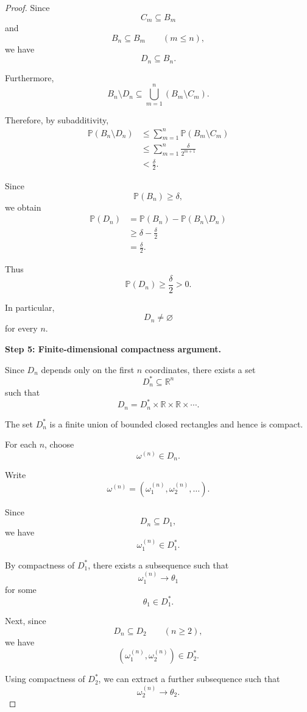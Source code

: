 \begin{proof}
Since
\[
C_m\subseteq B_m
\]
and
\[
B_n\subseteq B_m
\qquad
(m\leq n),
\]
we have
\[
D_n\subseteq B_n.
\]

Furthermore,
\[
B_n\setminus D_n
\subseteq
\bigcup_{m=1}^n(B_m\setminus C_m).
\]

Therefore, by subadditivity,
\[
\begin{aligned}
\mathbb{P}(B_n\setminus D_n)
&\leq
\sum_{m=1}^n
\mathbb{P}(B_m\setminus C_m)\\
&\leq
\sum_{m=1}^n
\frac{\delta}{2^{m+1}}\\
&<
\frac{\delta}{2}.
\end{aligned}
\]

Since
\[
\mathbb{P}(B_n)\geq\delta,
\]
we obtain
\[
\begin{aligned}
\mathbb{P}(D_n)
&=
\mathbb{P}(B_n)
-
\mathbb{P}(B_n\setminus D_n)\\
&\geq
\delta-\frac{\delta}{2}\\
&=
\frac{\delta}{2}.
\end{aligned}
\]

Thus
\[
\boxed{
\mathbb{P}(D_n)\geq\frac{\delta}{2}>0.
}
\tag{5}
\]

In particular,
\[
D_n\neq\varnothing
\]
for every $n$.

\medskip
\noindent
\textbf{Step 5: Finite-dimensional compactness argument.}

Since $D_n$ depends only on the first $n$ coordinates, there exists
a set
\[
D_n^*\subseteq\mathbb{R}^n
\]
such that
\[
D_n
=
D_n^*
\times
\mathbb{R}
\times\mathbb{R}\times\cdots.
\]

The set $D_n^*$ is a finite union of bounded closed rectangles and
hence is compact.

For each $n$, choose
\[
\omega^{(n)}\in D_n.
\]

Write
\[
\omega^{(n)}
=
\left(
\omega^{(n)}_1,
\omega^{(n)}_2,\ldots
\right).
\]

Since
\[
D_n\subseteq D_1,
\]
we have
\[
\omega^{(n)}_1\in D_1^*.
\]

By compactness of $D_1^*$, there exists a subsequence such that
\[
\omega^{(n)}_1\longrightarrow\theta_1
\]
for some
\[
\theta_1\in D_1^*.
\]

Next, since
\[
D_n\subseteq D_2
\qquad(n\geq2),
\]
we have
\[
(\omega^{(n)}_1,\omega^{(n)}_2)\in D_2^*.
\]

Using compactness of $D_2^*$, we can extract a further subsequence
such that
\[
\omega^{(n)}_2\longrightarrow\theta_2.
\]


\end{proof}
